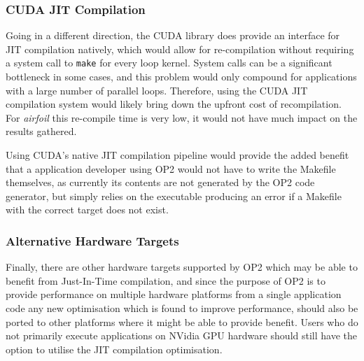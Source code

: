 \subsubsection{CUDA JIT Compilation}
Going in a different direction, the CUDA library does provide an interface for JIT compilation natively, which would allow for re-compilation without requiring a system call to \verb|make| for every loop kernel. System calls can be a significant bottleneck in some cases, and this problem would only compound for applications with a large number of parallel loops. Therefore, using the CUDA JIT compilation system would likely bring down the upfront cost of recompilation. For \textit{airfoil} this re-compile time is very low, it would not have much impact on the results gathered.
\par
Using CUDA's native JIT compilation pipeline would provide the added benefit that a application developer using OP2 would not have to write the Makefile themselves, as currently its contents are not generated by the OP2 code generator, but simply relies on the executable producing an error if a Makefile with the correct target does not exist.

\subsubsection{Alternative Hardware Targets}
Finally, there are other hardware targets supported by OP2 which may be able to benefit from Just-In-Time compilation, and since the purpose of OP2 is to provide performance on multiple hardware platforms from a single application code any new optimisation which is found to improve performance, should also be ported to other platforms where it might be able to provide benefit. Users who do not primarily execute applications on NVidia GPU hardware should still have the option to utilise the JIT compilation optimisation.

\clearpage
